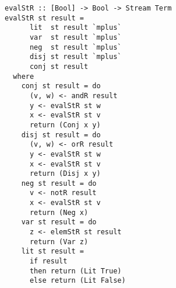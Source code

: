 

\begin{figure*}[!t]
  \centering
  \begin{minipage}{\textwidth}
    \begin{lstlisting}[label={eval_st_r}, caption={Functional implementation of the direction \lstinline{evalo out in in}}, captionpos=b, frame=tb]
evalStR :: [Bool] -> Bool -> Stream Term
evalStR st result =
      lit  st result `mplus`
      var  st result `mplus`
      neg  st result `mplus`
      disj st result `mplus`
      conj st result
  where
    conj st result = do
      (v, w) <- andR result
      y <- evalStR st w
      x <- evalStR st v
      return (Conj x y)
    disj st result = do
      (v, w) <- orR result
      y <- evalStR st w
      x <- evalStR st v
      return (Disj x y)
    neg st result = do
      v <- notR result
      x <- evalStR st v
      return (Neg x)
    var st result = do
      z <- elemStR st result
      return (Var z)
    lit st result =
      if result
      then return (Lit True)
      else return (Lit False)
    \end{lstlisting}
  \end{minipage}
\end{figure*}


